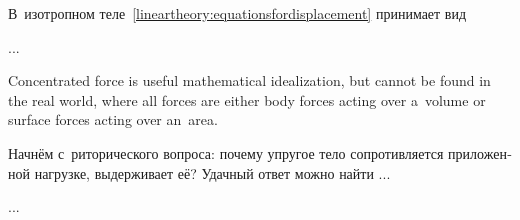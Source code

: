 \begin{otherlanguage}{russian}

В~изотропном теле~\eqref{lineartheory:equationsfordisplacement} принимает вид

...





{\small
Concentrated force is useful mathematical idealization, but cannot be found in the real world, where all forces are either body forces acting over a~volume or surface forces acting over an~area.
\par}

Начнём с~риторического вопроса: почему упругое тело сопротивляется приложенной нагрузке, выдерживает её? Удачный ответ можно найти ...

...







\label{para:displacementsfromdeformations}


\end{otherlanguage}
